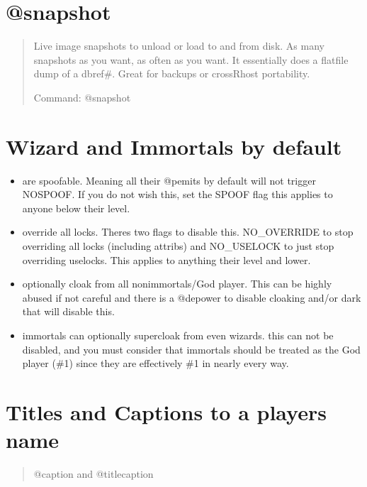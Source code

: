 \documentclass[letterpaper,10pt,english]{sphinxmanual}
\begin{document}
\section{@snapshot}
\label{\detokenize{features:snapshot}}\begin{quote}

\sphinxAtStartPar
Live image snapshots to unload or load to and from
disk.  As many snapshots as you want, as often as you want.
It essentially does a flatfile dump of a dbref\#.  Great for
backups or cross\sphinxhyphen{}Rhost portability.

\sphinxAtStartPar
Command: @snapshot
\end{quote}


\section{Wizard and Immortals by default}
\label{\detokenize{features:wizard-and-immortals-by-default}}\begin{itemize}
\item {} 
\sphinxAtStartPar
are spoofable.  Meaning all their @pemits by default will not
trigger NOSPOOF.  If you do not wish this, set the SPOOF flag
this applies to anyone below their level.

\item {} 
\sphinxAtStartPar
override all locks.  There\textquotesingle{}s two flags to disable this.
NO\_OVERRIDE to stop overriding all locks (including attribs)
and NO\_USELOCK to just stop overriding uselocks.
This applies to anything their level and lower.

\item {} 
\sphinxAtStartPar
optionally cloak from all non\sphinxhyphen{}immortals/God player.
This can be highly abused if not careful and there
is a @depower to disable cloaking and/or dark that will
disable this.

\item {} 
\sphinxAtStartPar
immortals can optionally supercloak from even wizards.
this can not be disabled, and you must consider that immortals
should be treated as the God player (\#1) since they are
effectively \#1 in nearly every way.

\end{itemize}


\section{Titles and Captions to a player\textquotesingle{}s name}
\label{\detokenize{features:titles-and-captions-to-a-player-s-name}}\begin{quote}

\sphinxAtStartPar
@caption and @titlecaption
\end{quote}
\end{document}
